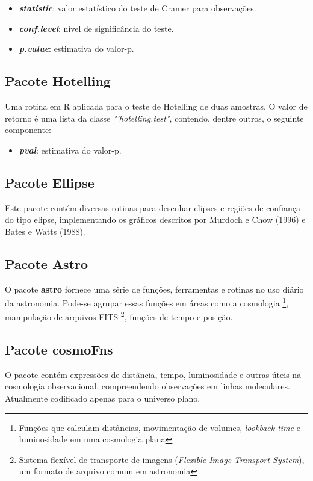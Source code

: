 \begin{itemize}
   \item \textit{\textbf{statistic}}: valor estatístico do teste de Cramer para observações.
   \item \textit{\textbf{conf.level}}: nível de significância do teste.
   \item \textit{\textbf{p.value}}: estimativa do valor-p.
 \end{itemize}  

\subsection{Pacote Hotelling}
Uma rotina em R aplicada para o teste de Hotelling de duas amostras. O valor de retorno é uma lista da classe \textit{"’hotelling.test"}, contendo, dentre outros, o seguinte componente:

\begin{itemize}
   \item \textit{\textbf{pval}}: estimativa do valor-p.
 \end{itemize} 


\subsection{Pacote Ellipse}

Este pacote contém diversas rotinas para desenhar elipses e regiões de confiança do tipo elipse, implementando os gráficos descritos por Murdoch e Chow (1996) e Bates e Watts (1988).


\subsection{Pacote Astro}

O pacote \textbf{astro} fornece uma série de funções, ferramentas e rotinas no uso diário da astronomia. Pode-se agrupar essas funções em áreas como a cosmologia \footnote{Funções que calculam distâncias, movimentação de volumes, \textit{lookback time} e luminosidade em uma cosmologia plana}, manipulação de arquivos FITS \footnote{Sistema flexível de transporte de imagens (\textit{Flexible Image Transport System}), um formato de arquivo comum em astronomia}, funções de tempo e posição.

\subsection{Pacote cosmoFns}
 O pacote contém expressões de distância, tempo, luminosidade e outras úteis na cosmologia observacional, compreendendo observações em linhas moleculares. Atualmente codificado apenas para o universo plano.

